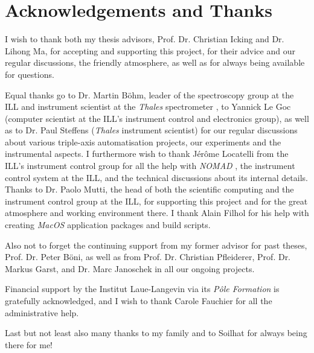%
%

\chapter*{Acknowledgements and Thanks}

I wish to thank both my thesis advisors, Prof. Dr. Christian Icking and Dr. Lihong Ma, for accepting
and supporting this project, for their advice and our regular discussions, the friendly atmosphere, 
as well as for always being available for questions.

Equal thanks go to Dr. Martin B\"ohm, leader of the spectroscopy group at the ILL and instrument
scientist at the \textit{Thales} spectrometer \cite{thales}, to Yannick Le Goc (computer scientist at the ILL's instrument
control and electronics group), as well as to Dr. Paul Steffens (\textit{Thales} instrument scientist) for our
regular discussions about various triple-axis automatisation projects, our experiments and the
instrumental aspects. I furthermore wish to thank Jérôme Locatelli from the ILL's instrument control group for
all the help with \textit{NOMAD} \cite{Mutti2011, web_NOMAD}, the instrument control system at the ILL, and the technical discussions
about its internal details. 
Thanks to Dr. Paolo Mutti, the head of both the scientific computing and the instrument control group 
at the ILL, for supporting this project and for the great atmosphere and working environment there.
I thank Alain Filhol for his help with creating \textit{MacOS} application packages and build scripts.

Also not to forget the continuing support from my former advisor for past theses, Prof. Dr. Peter B\"oni,
as well as from Prof. Dr. Christian Pfleiderer, Prof. Dr. Markus Garst, and Dr. Marc Janoschek in all our ongoing projects.

Financial support by the Institut Laue-Langevin via its \textit{P\^ole Formation} is gratefully acknowledged,
and I wish to thank Carole Fauchier for all the administrative help.

Last but not least also many thanks to my family and to Soilhat for always being there for me!
